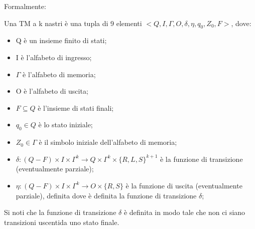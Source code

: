   Formalmente:
  \begin{definition} \label{TM}
    Una TM a k nastri è una tupla di 9 elementi \(<Q, I, \Gamma, O, \delta, \eta, q_0, Z_0, F>\), dove:
    \begin{itemize}
      \item Q è un insieme finito di stati;
      \item I è l'alfabeto di ingresso;
      \item \(\Gamma\) è l'alfabeto di memoria;
      \item O è l'alfabeto di uscita;
      \item \(F \subseteq Q\) è l'insieme di stati finali;
      \item \(q_0 \in Q\) è lo stato iniziale;
      \item \(Z_0\in \Gamma\) è il simbolo iniziale dell'alfabeto di memoria;
      \item \(\delta:(Q-F)\times I\times\Gamma^k\to Q\times\Gamma^k\times\{R,L,S\}^{k+1} \) è la funzione di transizione (eventualmente parziale);
      \item \(\eta:(Q-F)\times I\times \Gamma^k \to O\times\{R,S\}\) è la funzione di uscita (eventualmente parziale), definita dove è definita la funzione di transizione \(\delta\);
    \end{itemize}
  \end{definition}

  Si noti che la funzione di transizione \(\delta\) è definita in modo tale che non ci siano transizioni uscentida uno stato finale.

